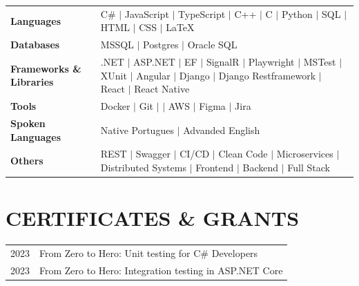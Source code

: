 \documentclass[letterpaper,11pt]{article}
\begin{document}
\begin{table}[htbp]
    \begin{tabularx}{\textwidth}{@{}lX@{}}
        \textbf{Languages} & C\# $\vert$ JavaScript $\vert$ TypeScript $\vert$ C++ $\vert$ C $\vert$ Python $\vert$ SQL $\vert$ HTML $\vert$ CSS $\vert$ \LaTeX \\
        \textbf{Databases} & MSSQL $\vert$ Postgres $\vert$ Oracle SQL \\
        \textbf{Frameworks \& Libraries} & .NET $\vert$ ASP.NET $\vert$ EF $\vert$ SignalR $\vert$ Playwright $\vert$ MSTest $\vert$ XUnit $\vert$ Angular $\vert$ Django $\vert$ Django Restframework $\vert$ React $\vert$ React Native \\
        \textbf{Tools} & Docker $\vert$ Git $\vert$ $\vert$ AWS $\vert$ Figma $\vert$ Jira \\
        \textbf{Spoken Languages} & Native Portugues $\vert$ Advanded English \\
        \textbf{Others} & REST $\vert$ Swagger $\vert$ CI/CD $\vert$ Clean Code $\vert$ Microservices $\vert$ Distributed Systems $\vert$ Frontend $\vert$ Backend $\vert$ Full Stack \\
    \end{tabularx}
\end{table}

\section{CERTIFICATES \& GRANTS}
{
    \begin{tabularx}{\textwidth}{@{}lX@{}}
        2023 & From Zero to Hero: Unit testing for C\# Developers \\
        2023 & From Zero to Hero: Integration testing in ASP.NET Core \\
    \end{tabularx}
}
\end{document}
